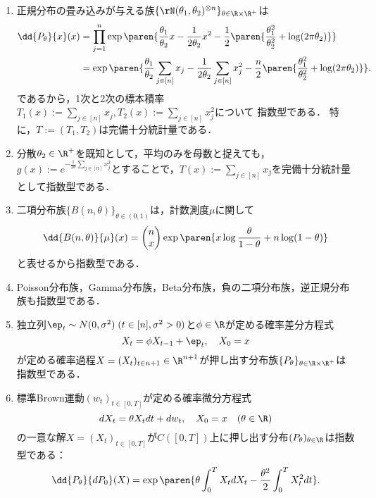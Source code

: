 \documentclass[uplatex,dvipdfmx]{jsreport}
\begin{document}
\begin{example}\mbox{}\label{exp-complete-sufficient-statistic-of-normal-family}
    \begin{enumerate}
        \item 正規分布の畳み込みが与える族$\{\rN(\theta_1,\theta_2)^{\otimes n}\}_{\theta\in\R\times\R^+}$は
        \begin{align*}
            \dd{P_\theta}{x}(x)&=\prod_{j=1}^n\exp\paren{\frac{\theta_1}{\theta_2}x-\frac{1}{2\theta_2}x^2-\frac{1}{2}\paren{\frac{\theta_1^2}{\theta_2^2}+\log(2\pi\theta_2)}}\\
            &=\exp\paren{\frac{\theta_1}{\theta_2}\sum_{j\in[n]}x_j-\frac{1}{2\theta_2}\sum_{j\in[n]}x_j^2-\frac{n}{2}\paren{\frac{\theta_1^2}{\theta_2^2}+\log(2\pi\theta_2)}}.
        \end{align*}
        であるから，1次と2次の標本積率$T_1(x):=\sum_{j\in[n]}x_j,T_2(x):=\sum_{j\in[n]}x_j^2$について
        指数型である．
        特に，$T:=(T_1,T_2)$は完備十分統計量である．
        \item 分散$\theta_2\in\R^+$を既知として，平均のみを母数と捉えても，$g(x):=e^{-\frac{1}{2\theta}\sum_{j\in[n]}x^2_j}$とすることで，$T(x):=\sum_{j\in[n]}x_j$を完備十分統計量として指数型である．
        \item 二項分布族$\{B(n,\theta)\}_{\theta\in(0,1)}$は，計数測度$\mu$に関して
        \[\dd{B(n,\theta)}{\mu}(x)=\begin{pmatrix}n\\ x\end{pmatrix}\exp\paren{x\log\frac{\theta}{1-\theta}+n\log(1-\theta)}\]
        と表せるから指数型である．
        \item Poisson分布族，Gamma分布族，Beta分布族，負の二項分布族，逆正規分布族も指数型である．
        \item 独立列$\ep_t\sim N(0,\sigma^2)\;(t\in[n],\sigma^2>0)$と$\phi\in\R$が定める確率差分方程式
        \[X_t=\phi X_{t-1}+\ep_t,\quad X_0=x\]
        が定める確率過程$X=(X_t)_{t\in n+1}\in\R^{n+1}$が押し出す分布族$\{P_\theta\}_{\theta\in\R\times\R^+}$は指数型である．
        \item 標準Brown運動$(w_t)_{t\in[0,T]}$が定める確率微分方程式
        \[dX_t=\theta X_tdt+dw_t,\quad X_0=x\quad(\theta\in\R)\]
        の一意な解$X=(X_t)_{t\in[0,T]}$が$C([0,T])$上に押し出す分布$(P_\theta)_{\theta\in\R}$は指数型である：
        \[\dd{P_\theta}{dP_0}(X)=\exp\paren{\theta\int^T_0X_tdX_t-\frac{\theta^2}{2}\int^T_0X^2_tdt}.\]
    \end{enumerate}
\end{example}
\end{document}
